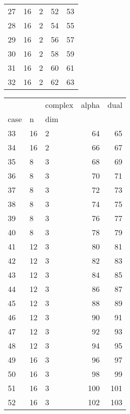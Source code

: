 \documentclass{article}
\begin{document}
\begin{center}
\begin{tabular}{lllrr}
\cline{1-5} \cline{2-5}
27 & 16 & 2 & 52 & 53 \\
\cline{1-5} \cline{2-5}
28 & 16 & 2 & 54 & 55 \\
\cline{1-5} \cline{2-5}
29 & 16 & 2 & 56 & 57 \\
\cline{1-5} \cline{2-5}
30 & 16 & 2 & 58 & 59 \\
\cline{1-5} \cline{2-5}
31 & 16 & 2 & 60 & 61 \\
\cline{1-5} \cline{2-5}
32 & 16 & 2 & 62 & 63 \\
\cline{1-5} \cline{2-5}
\bottomrule
\end{tabular}
\begin{tabular}{lllrr}
\toprule
&  & complex & alpha & dual \\
case & n & dim &  &  \\
\midrule
33 & 16 & 2 & 64 & 65 \\
\cline{1-5} \cline{2-5}
34 & 16 & 2 & 66 & 67 \\
\cline{1-5} \cline{2-5}
35 & 8 & 3 & 68 & 69 \\
\cline{1-5} \cline{2-5}
36 & 8 & 3 & 70 & 71 \\
\cline{1-5} \cline{2-5}
37 & 8 & 3 & 72 & 73 \\
\cline{1-5} \cline{2-5}
38 & 8 & 3 & 74 & 75 \\
\cline{1-5} \cline{2-5}
39 & 8 & 3 & 76 & 77 \\
\cline{1-5} \cline{2-5}
40 & 8 & 3 & 78 & 79 \\
\cline{1-5} \cline{2-5}
41 & 12 & 3 & 80 & 81 \\
\cline{1-5} \cline{2-5}
42 & 12 & 3 & 82 & 83 \\
\cline{1-5} \cline{2-5}
43 & 12 & 3 & 84 & 85 \\
\cline{1-5} \cline{2-5}
44 & 12 & 3 & 86 & 87 \\
\cline{1-5} \cline{2-5}
45 & 12 & 3 & 88 & 89 \\
\cline{1-5} \cline{2-5}
46 & 12 & 3 & 90 & 91 \\
\cline{1-5} \cline{2-5}
47 & 12 & 3 & 92 & 93 \\
\cline{1-5} \cline{2-5}
48 & 12 & 3 & 94 & 95 \\
\cline{1-5} \cline{2-5}
49 & 16 & 3 & 96 & 97 \\
\cline{1-5} \cline{2-5}
50 & 16 & 3 & 98 & 99 \\
\cline{1-5} \cline{2-5}
51 & 16 & 3 & 100 & 101 \\
\cline{1-5} \cline{2-5}
52 & 16 & 3 & 102 & 103 \\
\cline{1-5} \cline{2-5}

\end{tabular}
\end{center}
\end{document}

